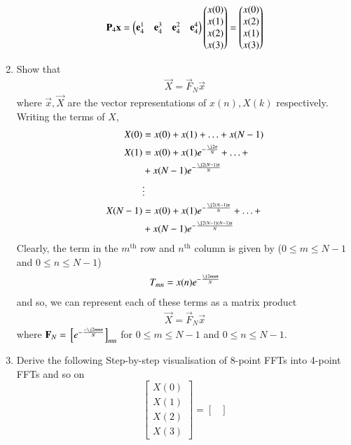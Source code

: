 \documentclass[journal,12pt,twocolumn]{IEEEtran}
\renewcommand\thesection{\arabic{section}}
\begin{document}
\begin{enumerate}[label=\arabic*.,ref=\thesection.\theenumi]
\begin{align}
	\textbf{P}_4\textbf{x} = \begin{pmatrix}\textbf{e}_4^1 & \textbf{e}_4^3 & \textbf{e}_4^2 & \textbf{e}_4^4\end{pmatrix}\begin{pmatrix}x(0)\\x(1)\\x(2)\\x(3)\end{pmatrix} = \begin{pmatrix}x(0)\\x(2)\\x(1)\\x(3)\end{pmatrix}
	\label{eq:x-permute}
\end{align}
\item Show that 
    \begin{align}
	    \vec{X} = \vec{F}_N \vec{x}
	    \label{eq:dft-mat-def}
    \end{align}
		where $\vec{x}, \vec{X}$ are the vector representations of $x(n), X(k)$ respectively.\\
		\solution  Writing the terms of $X$, 
		\begin{align}
			X(0) &= x(0) + x(1) + \ldots + x(N - 1) \\
			X(1) &= x(0) + x(1)e^{-\frac{\j2\pi}{N}} + \ldots + \nonumber \\
				 &+ x(N - 1)e^{-\frac{\j2(N - 1)\pi}{N}} \\
				 &\vdots \nonumber \\
			X(N - 1) &= x(0) + x(1)e^{-\frac{\j2(N - 1)\pi}{N}} + \ldots + \nonumber \\
					 &+ x(N - 1)e^{-\frac{\j2(N - 1)(N - 1)\pi}{N}}	
		\end{align}
		Clearly, the term in the $m^{\text{th}}$ row and $n^{\text{th}}$ column is given by ($0 \leq m \leq N - 1$ and $0 \leq n \leq N - 1$) 
		\begin{align}
			T_{mn} = x(n)e^{-\frac{\j2mn\pi}{N}} 
		\end{align}
		and so, we can represent each of these terms as a matrix product
		\begin{align}
			\vec{X} = \vec{F}_N\vec{x}
		\end{align}
		where $\vec{F}_N = \sbrak{e^{-\frac{-\j2mn\pi}{N}}}_{mn}$ for $0 \leq m \leq N - 1$ and $0 \leq n \leq N - 1$.
\item Derive the following Step-by-step visualisation  of
8-point FFTs into 4-point FFTs and so on
\begin{equation}
\begin{bmatrix}
X(0) \\ 
X(1) \\ 
X(2) \\ 
X(3)
\end{bmatrix}
=
\begin{bmatrix}

\end{bmatrix}
\end{equation}
\end{enumerate}
\end{document}
